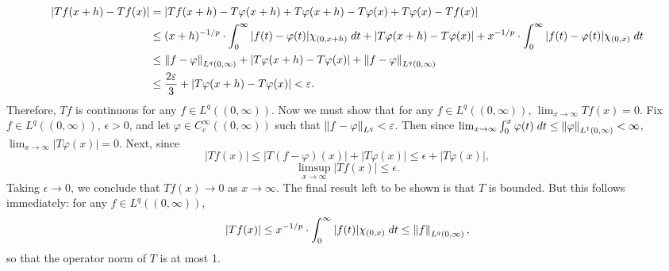 \documentclass{article}
\begin{document}
	\begin{align*}
		\begin{split}
			|Tf(x + h) - Tf(x)| &= |Tf(x + h) - T\varphi(x + h) + T\varphi(x + h) - T\varphi(x) + T\varphi(x) - Tf(x)| \\
			&\leq (x + h)^{-1/p} \cdot \int_{0}^{\infty}|f(t) - \varphi(t)|\chi_{(0, x + h)}\;dt + |T\varphi(x + h) - T\varphi(x)| + x^{-1/p}\cdot \int_{0}^{\infty}|f(t) - \varphi(t)|\chi_{(0,x)}\;dt \\
			&\leq \left\Vert f - \varphi \right\Vert_{L^{q}(0, \infty)} + |T\varphi(x + h) - T\varphi(x)| + \left\Vert f - \varphi \right\Vert_{L^{q}(0, \infty)} \\
			&\leq \frac{2\varepsilon}{3} + |T\varphi(x + h) - T\varphi(x)| < \varepsilon. 
		\end{split}
	\end{align*}
	Therefore, $Tf$ is continuous for any $f \in L^{q}((0, \infty))$. Now we must show that for any $f \in L^{q}((0, \infty))$, $\lim_{x \to \infty}Tf(x) = 0$. Fix $f \in L^{q}((0,\infty))$, $\epsilon > 0$, and let $\varphi \in C_{c}^{\infty}((0, \infty))$ such that $\left\Vert f - \varphi \right\Vert_{L^{q}} < \varepsilon$. Then since $\lim_{x \to \infty}\int_{0}^{x}\varphi(t)\;dt \leq \left\Vert \varphi \right\Vert_{L^{1}(0,\infty)} < \infty$, $\lim_{x \to \infty}|T\varphi(x)| = 0$. Next, since  
	\begin{equation*}
		|Tf(x)| \leq |T(f - \varphi)(x)| + |T\varphi(x)| \leq \epsilon + |T\varphi(x)|, 
	\end{equation*} 
	\begin{equation*}
		\limsup_{x \to \infty}|Tf(x)| \leq \epsilon. 
	\end{equation*}
	Taking $\epsilon \to 0$, we conclude that $Tf(x) \to0$ as $x \to \infty$. The final result left to be shown is that $T$ is bounded. But this follows immediately: for any $f \in L^{q}((0,\infty))$, 
	\begin{equation*}
		|Tf(x)| \leq x^{-1/p} \cdot \int_{0}^{\infty}|f(t)|\chi_{(0,x)}\;dt \leq \left\Vert f \right\Vert_{L^{q}(0,\infty)}, 
	\end{equation*}
	so that the operator norm of $T$ is at most 1. 
	
\end{document}
